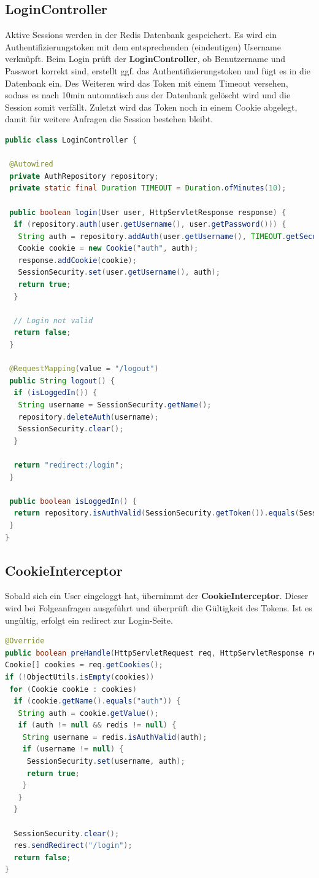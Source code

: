 \documentclass[
    a4paper
]{scrreprt}
\begin{document}
\subsection{LoginController}
	Aktive Sessions werden in der Redis Datenbank gespeichert. Es wird ein Authentifizierungstoken mit dem entsprechenden (eindeutigen) Username verknüpft. Beim Login prüft der \textbf{LoginController}, ob Benutzername und Passwort korrekt sind, erstellt ggf. das Authentifizierungstoken und fügt es in die Datenbank ein. Des Weiteren wird das Token mit einem Timeout versehen, sodass es nach 10min automatisch aus der Datenbank gelöscht wird und die Session somit verfällt. Zuletzt wird das Token noch in einem Cookie abgelegt, damit für weitere Anfragen die Session bestehen bleibt.
	\begin{lstlisting}[language=java]
public class LoginController {
	
 @Autowired
 private AuthRepository repository;
 private static final Duration TIMEOUT = Duration.ofMinutes(10);

 public boolean login(User user, HttpServletResponse response) {
  if (repository.auth(user.getUsername(), user.getPassword())) {
   String auth = repository.addAuth(user.getUsername(), TIMEOUT.getSeconds(), TimeUnit.SECONDS);
   Cookie cookie = new Cookie("auth", auth);
   response.addCookie(cookie);
   SessionSecurity.set(user.getUsername(), auth);
   return true;
  }

  // Login not valid
  return false;
 }

 @RequestMapping(value = "/logout")
 public String logout() {
  if (isLoggedIn()) {
   String username = SessionSecurity.getName();
   repository.deleteAuth(username);
   SessionSecurity.clear();
  }

  return "redirect:/login";
 }

 public boolean isLoggedIn() {
  return repository.isAuthValid(SessionSecurity.getToken()).equals(SessionSecurity.getName());
 }
}
	\end{lstlisting}
	
	\subsection{CookieInterceptor}
	Sobald sich ein User eingeloggt hat, übernimmt der \textbf{CookieInterceptor}. Dieser wird bei Folgeanfragen ausgeführt und überprüft die Gültigkeit des Tokens. Ist es ungültig, erfolgt ein redirect zur Login-Seite.
	\begin{lstlisting}[language=java]
@Override
public boolean preHandle(HttpServletRequest req, HttpServletResponse res, Object handler) throws Exception {
Cookie[] cookies = req.getCookies();
if (!ObjectUtils.isEmpty(cookies))
 for (Cookie cookie : cookies)
  if (cookie.getName().equals("auth")) {
   String auth = cookie.getValue();
   if (auth != null && redis != null) {
    String username = redis.isAuthValid(auth);
    if (username != null) {
     SessionSecurity.set(username, auth);
     return true;
    }
   }
  }

  SessionSecurity.clear();
  res.sendRedirect("/login");
  return false;
}
	\end{lstlisting}
	
\end{document}
